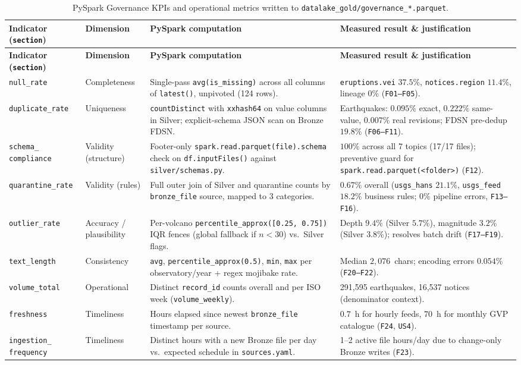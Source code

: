 \documentclass[11pt,a4paper]{article}
\begin{document}
\begin{longtable}{L{2.8cm}L{2.3cm}L{4.8cm}L{4.4cm}}
\caption{PySpark Governance KPIs and operational metrics written to \texttt{datalake\_gold/governance\_*.parquet}.}\label{tab:gov_kpis}\\
\toprule
\textbf{Indicator (\texttt{section})} & \textbf{Dimension} & \textbf{PySpark computation} & \textbf{Measured result \& justification}\\
\midrule
\endfirsthead
\toprule
\textbf{Indicator (\texttt{section})} & \textbf{Dimension} & \textbf{PySpark computation} & \textbf{\textbf{Measured result \& justification}}\\
\midrule
\endhead
\texttt{null\_rate} & Completeness & Single-pass \texttt{avg(is\_missing)} across all columns of \texttt{latest()}, unpivoted (124 rows). & \texttt{eruptions.vei} $37.5\%$, \texttt{notices.region} $11.4\%$, lineage $0\%$ (\texttt{F01--F05}).\\
\texttt{duplicate\_rate} & Uniqueness & \texttt{countDistinct} with \texttt{xxhash64} on value columns in Silver; explicit-schema JSON scan on Bronze FDSN. & Earthquakes: $0.095\%$ exact, $0.222\%$ same-value, $0.007\%$ real revisions; FDSN pre-dedup $19.8\%$ (\texttt{F06--F11}).\\
\texttt{schema\_ compliance} & Validity (structure) & Footer-only \texttt{spark.read.parquet(file).schema} check on \texttt{df.inputFiles()} against \texttt{silver/schemas.py}. & $100\%$ across all 7 topics (17/17 files); preventive guard for \texttt{spark.read.parquet(<folder>)} (\texttt{F12}).\\
\texttt{quarantine\_rate} & Validity (rules) & Full outer join of Silver and quarantine counts by \texttt{bronze\_file} source, mapped to 3 categories. & $0.67\%$ overall (\texttt{usgs\_hans} $21.1\%$, \texttt{usgs\_feed} $18.2\%$ business rules; $0\%$ pipeline errors, \texttt{F13--F16}).\\
\texttt{outlier\_rate} & Accuracy / plausibility & Per-volcano \texttt{percentile\_approx([0.25, 0.75])} IQR fences (global fallback if $n<30$) vs.\ Silver flags. & Depth $9.4\%$ (Silver $5.7\%$), magnitude $3.2\%$ (Silver $3.8\%$); resolves batch drift (\texttt{F17--F19}).\\
\texttt{text\_length} & Consistency & \texttt{avg}, \texttt{percentile\_approx(0.5)}, \texttt{min}, \texttt{max} per observatory/year + regex mojibake rate. & Median $2,076$~chars; encoding errors $0.054\%$ (\texttt{F20--F22}).\\
\texttt{volume\_total} & Operational & Distinct \texttt{record\_id} counts overall and per ISO week (\texttt{volume\_weekly}). & 291,595 earthquakes, 16,537 notices (denominator context).\\
\texttt{freshness} & Timeliness & Hours elapsed since newest \texttt{bronze\_file} timestamp per source. & $0.7$~h for hourly feeds, $70$~h for monthly GVP catalogue (\texttt{F24}, \texttt{US4}).\\
\texttt{ingestion\_ frequency} & Timeliness & Distinct hours with a new Bronze file per day vs.\ expected schedule in \texttt{sources.yaml}. & 1--2 active file hours/day due to change-only Bronze writes (\texttt{F23}).\\
\bottomrule
\end{longtable}
\end{document}
